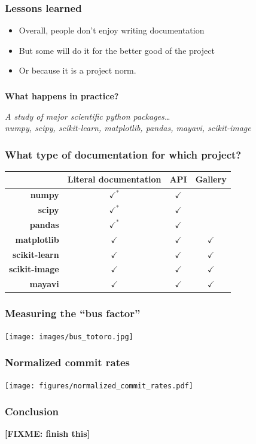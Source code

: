 \documentclass[xcolor=dvipsnames]{beamer}
\newcommand{\heading}[1]{\multicolumn{1}{c}{#1}}
\newcommand{\fixme}[1]{\textbf{[FIXME: #1]}}
\begin{document}
\begin{frame}
\frametitle{Lessons learned}
\Large \bf
\begin{itemize}[label={$\bullet$}]
\item Overall, people don't enjoy writing documentation
\item But some will do it for the better good of the project
\item Or because it is a project norm.
\end{itemize}
\end{frame}

\begin{frame}
\frametitle{}
{\Large \bf What happens in practice?}
\begin{flushright}
\em A study of major scientific python packages\dots \\
{\footnotesize numpy, scipy, scikit-learn, matplotlib, pandas, mayavi,
scikit-image}
\end{flushright}
\end{frame}

\begin{frame}
\frametitle{What type of documentation for which project?}

\begin{table}
\begin{tabularx}{\linewidth}{r | X X X}
 & \heading{\textbf{Literal documentation}} & \heading{\textbf{API}} &
 \heading{\textbf{Gallery}} \\
\hline
\textbf{numpy} & \heading{$\checkmark^*$} & \heading{$\checkmark$} & \\
\textbf{scipy} & \heading{$\checkmark^*$} & \heading{$\checkmark$} & \\
\textbf{pandas} & \heading{$\checkmark^*$} & \heading{$\checkmark$} & \\
\textbf{matplotlib} & \heading{$\checkmark$} & \heading{$\checkmark$} &
\heading{$\checkmark$}\\
\textbf{scikit-learn} & \heading{$\checkmark$} & \heading{$\checkmark$} &
\heading{$\checkmark$} \\
\textbf{scikit-image} & \heading{$\checkmark$} & \heading{$\checkmark$} &
\heading{$\checkmark$} \\
\textbf{mayavi} & \heading{$\checkmark$} & \heading{$\checkmark$} &
\heading{$\checkmark$} \\
\end{tabularx}
\end{table}
\end{frame}

\begin{frame}
\frametitle{Measuring the ``bus factor''}
\texttt{[image: images/bus\_totoro.jpg]}
\end{frame}

\begin{frame}
\frametitle{Normalized commit rates}
\texttt{[image: figures/normalized\_commit\_rates.pdf]}
\end{frame}



\begin{frame}
\frametitle{Conclusion}
\fixme{finish this}
\end{frame}
\end{document}
